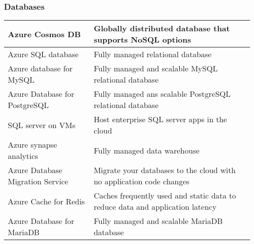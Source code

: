 \documentclass{article}[18pt]
\begin{document}
\subsubsection{Databases}
{\renewcommand{\arraystretch}{2}
	\begin{tabularx}{\textwidth}{X X}
		
		Azure Cosmos DB& Globally distributed database that supports NoSQL options\\
		\hline
		Azure SQL database& Fully managed relational database\\
		\hline
		Azure database for MySQL& Fully managed and scalable MySQL relational database\\
		\hline
		Azure Database for PostgreSQL & Fully managed ans scalable PostgreSQL relational database\\
		\hline 
		SQL server on VMs& Host enterprise SQL server apps in the cloud\\
		\hline
		Azure synapse analytics& Fully managed data warehouse\\
		\hline
		Azure Database Migration Service& Migrate your databases to the cloud with no application code changes\\
		\hline
		Azure Cache for Redis& Caches frequently used and static data to reduce data and application latency\\
		\hline
		Azure Database for MariaDB& Fully managed and scalable MariaDB database
		
		
	\end{tabularx}
}
\end{document}
